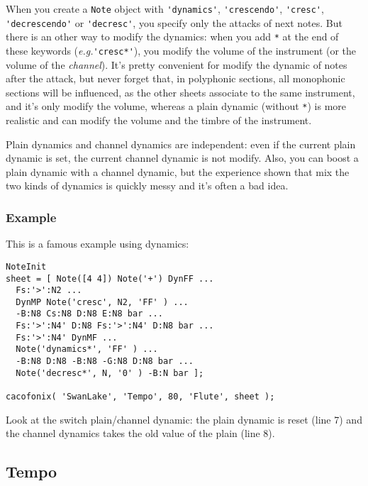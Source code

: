 \documentclass{article}
\newcommand{\note}{\lstinline!Note!\xspace}
\newcommand{\eg}{\emph{e.g.}\xspace}
\begin{document}
When you create a \note object with \lstinline!'dynamics'!, \lstinline!'crescendo'!, \lstinline!'cresc'!, \lstinline!'decrescendo'! or \lstinline!'decresc'!, you specify only the attacks of next notes. But there is an other way to modify the dynamics: when you add \lstinline!*! at the end of these keywords (\eg \lstinline!'cresc*'!), you modify the volume of the instrument (or the volume of the \emph{channel}). It's pretty convenient for modify the dynamic of notes after the attack, but never forget that, in polyphonic sections, all monophonic sections will be influenced, as the other sheets associate to the same instrument, and it's only modify the volume, whereas a plain dynamic (without \lstinline!*!) is more realistic and can modify the volume and the timbre of the instrument.

Plain dynamics and channel dynamics are independent: even if the current plain dynamic is set, the current channel dynamic is not modify. Also, you can boost a plain dynamic with a channel dynamic, but the experience shown that mix the two kinds of dynamics is quickly messy and it's often a bad idea.

\subsubsection{Example}

This is a famous example using dynamics: \\

\begin{lstlisting}
NoteInit
sheet = [ Note([4 4]) Note('+') DynFF ...
  Fs:'>':N2 ...
  DynMP Note('cresc', N2, 'FF' ) ...
  -B:N8 Cs:N8 D:N8 E:N8 bar ...
  Fs:'>':N4' D:N8 Fs:'>':N4' D:N8 bar ...
  Fs:'>':N4' DynMF ...
  Note('dynamics*', 'FF' ) ...
  -B:N8 D:N8 -B:N8 -G:N8 D:N8 bar ...
  Note('decresc*', N, '0' ) -B:N bar ];

cacofonix( 'SwanLake', 'Tempo', 80, 'Flute', sheet );
\end{lstlisting}

Look at the switch plain/channel dynamic: the plain dynamic is reset (line 7) and the channel dynamics takes the old value of the plain (line 8).

\subsection{Tempo}
\label{sec:Tempo}
\end{document}
